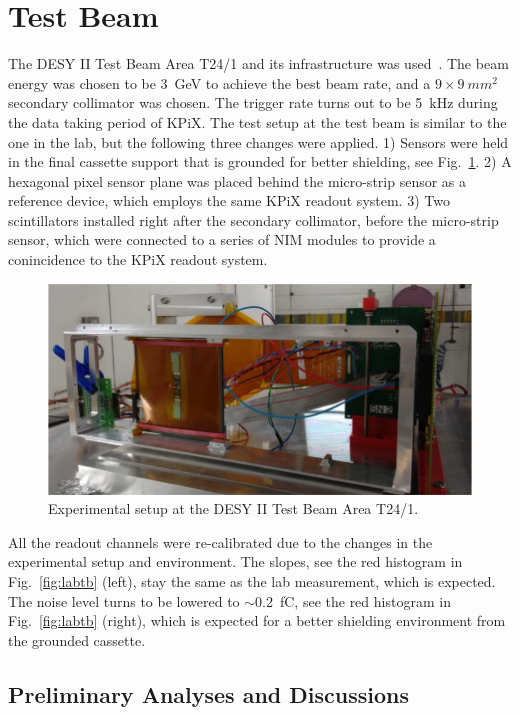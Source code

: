 \documentclass[conference]{IEEEtran}
\begin{document}
\section{Test Beam}
The DESY II Test Beam Area T24/1 and its infrastructure was used~\cite{desytbf}.
The beam energy was chosen to be \SI{3}{GeV} to achieve the best beam rate, and a $9\times\SI{9}{mm^2}$ secondary collimator was chosen.
The trigger rate turns out to be \SI{5}{kHz} during the data taking period of KPiX.
The test setup at the test beam is similar to the one in the lab, but the following three changes were applied.
1) Sensors were held in the final cassette support that is grounded for better shielding, see Fig.~\ref{fig:tb2}.
2) A hexagonal pixel sensor plane was placed behind the micro-strip sensor as a reference device, which employs the same KPiX readout system.
3) Two scintillators installed right after the secondary collimator, before the micro-strip sensor, which were connected to a series of NIM modules to provide a conincidence to the KPiX readout system.

\begin{figure}[!ht]%
  \centering
  \includegraphics[width=1.0\linewidth]{pics/tb_2.png}
  \caption{Experimental setup at the DESY II Test Beam Area T24/1.}%
\label{fig:tb2}%
\end{figure}

All the readout channels were re-calibrated due to the changes in the experimental setup and environment.
The slopes, see the red histogram in Fig.~\ref{fig:labtb} (left), stay the same as the lab measurement, which is expected.
The noise level turns to be lowered to $\sim$\SI{0.2}{fC}, see the red histogram in Fig.~\ref{fig:labtb} (right),
which is expected for a better shielding environment from the grounded cassette.

\subsection*{Preliminary Analyses and Discussions}
\end{document}
